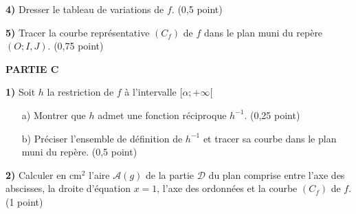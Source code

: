 \documentclass[11pt]{article}
\begin{document}
\vspace{0.2cm}
\noindent
\textbf{4)} Dresser le tableau de variations de \( f \). \hfill (0,5 point)

\noindent
\textbf{5)} Tracer la courbe représentative \( (C_f) \) de \( f \) dans le plan muni du repère \( (O; I, J) \). \hfill (0,75 point)

\vspace{0.4cm}
\noindent
\textbf{PARTIE C}

\noindent
\textbf{1)} Soit \( h \) la restriction de \( f \) à l’intervalle \( [\alpha ; +\infty[ \)

\begin{enumerate}
    \item[a)] Montrer que \( h \) admet une fonction réciproque \( h^{-1} \). \hfill (0,25 point)
    
    \item[b)] Préciser l’ensemble de définition de \( h^{-1} \) et tracer sa courbe dans le plan muni du repère. \hfill (0,5 point)
\end{enumerate}

\vspace{0.2cm}
\noindent
\textbf{2)} Calculer en \( \text{cm}^2 \) l’aire \( \mathcal{A}(g) \) de la partie \( \mathcal{D} \) du plan comprise entre l’axe des abscisses, la droite d’équation \( x = 1 \), l’axe des ordonnées et la courbe \( (C_f) \) de \( f \). \hfill (1 point)
\end{document}
